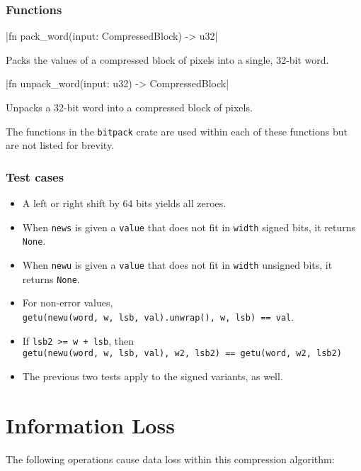 \documentclass[12pt, letterpaper]{article}
\begin{document}
    \subsubsection{Functions}

    |fn pack_word(input: CompressedBlock) -> u32|

    Packs the values of a compressed block of pixels into a single, 32-bit word.

    |fn unpack_word(input: u32) -> CompressedBlock|

    Unpacks a 32-bit word into a compressed block of pixels.

    The functions in the \verb|bitpack| crate are used within each of these functions but are not listed for brevity.

    \subsubsection{Test cases}

    \begin{itemize}
        \item A left or right shift by 64 bits yields all zeroes.
        \item When \verb|news| is given a \verb|value| that does not fit in \verb|width| signed bits, it
        returns \verb|None|.
        \item When \verb|newu| is given a \verb|value| that does not fit in \verb|width| unsigned bits, it
        returns \verb|None|.
        \item For non-error values, \\
        \verb|getu(newu(word, w, lsb, val).unwrap(), w, lsb) == val|.
        \item If \verb|lsb2 >= w + lsb|, then \\
        \verb|getu(newu(word, w, lsb, val), w2, lsb2) == getu(word, w2, lsb2)|
        \item The previous two tests apply to the signed variants, as well.
    \end{itemize}


    \section{Information Loss}

    The following operations cause data loss within this compression algorithm:
\end{document}
